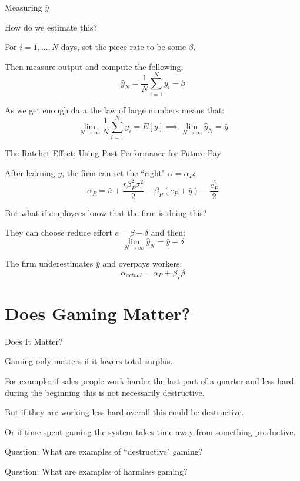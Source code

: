 \documentclass[aspectratio=169,usenames,dvipsnames]{beamer}
\newenvironment{wideitemize}{\itemize\addtolength{\itemsep}{10pt}}{\enditemize}
\begin{document}
\begin{frame}{Measuring $\bar y$}
\begin{wideitemize}
    \item How do we estimate this?
    \item For $i=1,...,N$ days, set the piece rate to be some $\beta$.
    \item Then measure output and compute the following:
    \[ \hat{ y}_N = \frac{1}{N}\sum_{i=1}^N  y_i -  \beta \]
    \item As we get enough data the law of large numbers means that:
    \[ \lim_{N\to \infty} \frac{1}{N}\sum_{i=1}^N  y_i = E[y] \implies \lim_{N\to \infty} \hat{ y}_N = \bar y \]
\end{wideitemize}
    
\end{frame}

\begin{frame}{The Ratchet Effect: Using Past Performance for Future Pay}
    \begin{wideitemize}
    \item After learning $\bar y$, the firm can set the ``right" $\alpha=\alpha_P$:
    \[\alpha_P = \bar u+\frac{r\beta_P^2 \sigma^2}{2}-\beta_P (e_P+\bar y) -\frac{e_P^2}{2}\]
    \item But what if employees know that the firm is doing this?\pause 
    \item They can choose reduce effort $e=\beta-\delta $ and then:
    \[ \lim_{N\to \infty} \hat{y}_N = \bar y - \delta\]
    \item The firm underestimates $\bar y$ and overpays workers:
\[\alpha_{actual} = \alpha_P+\beta_P \delta   \]
\end{wideitemize}

\end{frame}



\section{Does Gaming Matter?}

\begin{frame}{Does It Matter?}
    \begin{wideitemize}
        \item Gaming only matters if it lowers total surplus.
        \item For example: if sales people work harder the last part of a quarter and less hard during the beginning this is not necessarily destructive.
        \item But if they are working less hard overall this could be destructive.
        \item Or if time spent gaming the system takes time away from something productive.
        \item Question: What are examples of ``destructive" gaming?
        \item Question: What are examples of harmless gaming?
    \end{wideitemize}
\end{frame}
\end{document}
